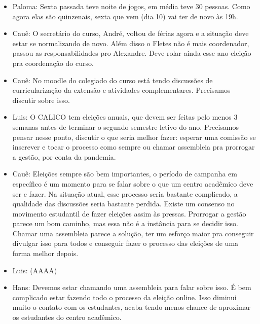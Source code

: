 \documentclass{ata-calico}
\begin{document}
\maketitle

\begin{itemize}
\item Paloma: Sexta passada teve noite de jogos, em média teve 30 pessoas. Como agora elas são quinzenais, sexta que vem (dia 10) vai ter de novo às 19h.
\item Cauê: O secretário do curso, André, voltou de férias agora e a situação deve estar se normalizando de novo. Além disso o Fletes não é mais coordenador, passou as responsabilidades pro Alexandre. Deve rolar ainda esse ano eleição pra coordenação do curso.
\item Cauê: No moodle do colegiado do curso está tendo discussões de curricularização da extensão e atividades complementares. Precisamos discutir sobre isso.
\end{itemize}

\begin{itemize}
\item Luis: O CALICO tem eleições anuais, que devem ser feitas pelo menos 3 semanas antes de terminar o segundo semestre letivo do ano. Precisamos pensar nesse ponto, discutir o que seria melhor fazer: esperar uma comissão se inscrever e tocar o processo como sempre ou chamar assembleia pra prorrogar a gestão, por conta da pandemia.
\item Cauê: Eleições sempre são bem importantes, o período de campanha em específico é um momento para se falar sobre o que um centro acadêmico deve ser e fazer. Na situação atual, esse processo seria bastante complicado, a qualidade das discussões seria bastante perdida. Existe um consenso no movimento estudantil de fazer eleições assim às pressas. Prorrogar a gestão parece um bom caminho, mas essa não é a instância para se decidir isso. Chamar uma assembleia parece a solução, ter um esforço maior pra conseguir divulgar isso para todos e conseguir fazer o processo das eleições de uma forma melhor depois.
\item Luis: (AAAA)
\item Hans: Devemos estar chamando uma assembleia para falar sobre isso. É bem complicado estar fazendo todo o processo da eleição online. Isso diminui muito o contato com os estudantes, acaba tendo menos chance de aproximar os estudantes do centro acadêmico.
\end{itemize}
\end{document}
